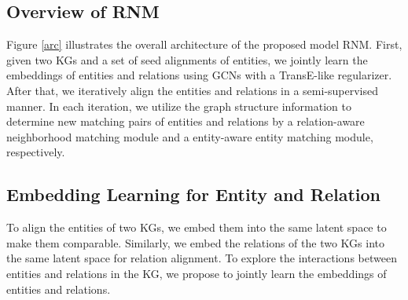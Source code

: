 \documentclass[letterpaper]{article} %
\begin{document}
\subsection{Overview of RNM}

Figure \ref{arc} illustrates the overall architecture of the
proposed model RNM. First, given two KGs and a set of seed
alignments of entities, we jointly learn the embeddings of entities
and relations using GCNs with a TransE-like regularizer. After that,
we iteratively align the entities and relations in a semi-supervised
manner. In each iteration, we utilize the graph structure
information to determine new matching pairs of entities and
relations by a relation-aware neighborhood matching module and a
entity-aware entity matching module, respectively.



\subsection{Embedding Learning for Entity and Relation}

To align the entities of two KGs, we embed them into the same
latent space to make them comparable. Similarly, we embed the
relations of the two KGs into the same latent space for relation
alignment. To explore the interactions between entities and
relations in the KG, we propose to jointly learn the embeddings of
entities and relations.

\end{document}
